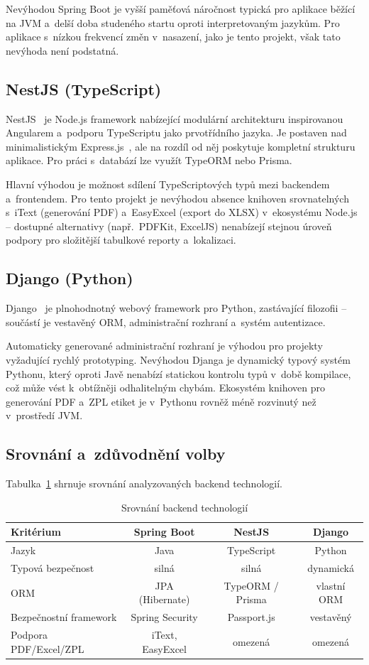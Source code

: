 Nevýhodou Spring Boot je vyšší paměťová náročnost typická pro aplikace běžící na JVM a~delší doba studeného startu oproti interpretovaným jazykům. Pro aplikace s~nízkou frekvencí změn v~nasazení, jako je tento projekt, však tato nevýhoda není podstatná.

\subsection{NestJS (TypeScript)}

NestJS~\cite{nestjs} je Node.js framework nabízející modulární architekturu inspirovanou Angularem a~podporu TypeScriptu jako prvotřídního jazyka. Je postaven nad minimalistickým Express.js~\cite{expressjs}, ale na rozdíl od něj poskytuje kompletní strukturu aplikace. Pro práci s~databází lze využít TypeORM nebo Prisma.

Hlavní výhodou je možnost sdílení TypeScriptových typů mezi backendem a~frontendem. Pro tento projekt je nevýhodou absence knihoven srovnatelných s~iText (generování PDF) a~EasyExcel (export do XLSX) v~ekosystému Node.js -- dostupné alternativy (např.\ PDFKit, ExcelJS) nenabízejí stejnou úroveň podpory pro složitější tabulkové reporty a~lokalizaci.

\subsection{Django (Python)}

Django~\cite{django} je plnohodnotný webový framework pro Python, zastávající filozofii  -- součástí je vestavěný ORM, administrační rozhraní a~systém autentizace.

Automaticky generované administrační rozhraní je výhodou pro projekty vyžadující rychlý prototyping. Nevýhodou Djanga je dynamický typový systém Pythonu, který oproti Javě nenabízí statickou kontrolu typů v~době kompilace, což může vést k~obtížněji odhalitelným chybám. Ekosystém knihoven pro generování PDF a~ZPL etiket je v~Pythonu rovněž méně rozvinutý než v~prostředí JVM.

\subsection{Srovnání a~zdůvodnění volby}

Tabulka~\ref{tab:backend-comparison} shrnuje srovnání analyzovaných backend technologií.

\begin{table}[htbp]\centering\footnotesize
\caption{Srovnání backend technologií}\label{tab:backend-comparison}
\begin{tabular}{l|c|c|c}
	\textbf{Kritérium} & \textbf{Spring Boot} & \textbf{NestJS} & \textbf{Django} \tabularnewline \hline
	Jazyk & Java & TypeScript & Python \tabularnewline
	Typová bezpečnost & silná & silná & dynamická \tabularnewline
	ORM & JPA (Hibernate) & TypeORM / Prisma & vlastní ORM \tabularnewline
	Bezpečnostní framework & Spring Security & Passport.js & vestavěný \tabularnewline
	Podpora PDF/Excel/ZPL & iText, EasyExcel & omezená & omezená \tabularnewline
\end{tabular}
\end{table}

